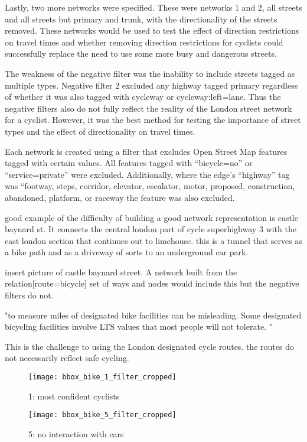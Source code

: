 Lastly, two more networks were specified. These were networks 1 and 2, all streets and all streets but primary and trunk, with the directionality of the streets removed. These networks would be used to test the effect of direction restrictions on travel times and whether removing direction restrictions for cyclists could successfully replace the need to use some more busy and dangerous streets. 

The weakness of the negative filter was the inability to include streets tagged as multiple types. Negative filter 2 excluded any highway tagged primary regardless of whether it was also tagged with cycleway or cycleway:left=lane. Thus the negative filters also do not fully reflect the reality of the London street network for a cyclist. However, it was the best method for testing the importance of street types and the effect of directionality on travel times. 


Each network is created using a filter that excludes Open Street Map features tagged with certain values. All features tagged with ``bicycle=no'' or ``service=private'' were excluded. Additionally, where the edge's ``highway'' tag was ``footway, steps, corridor, elevator, escalator, motor, proposed, construction, abandoned, platform, or raceway the feature was also excluded. 

good example of the difficulty of building a good network representation is castle baynard st. It connects the central london part of cycle superhighway 3 with the east london section that continues out to limehouse. this is a tunnel that serves as a bike path and as a driveway of sorts to an underground car park. 

insert picture of castle baynard street. A network built from the relation[route=bicycle] set of ways and nodes would include this but the negative filters do not. 


"to measure miles of designated bike facilities can be misleading. Some designated bicycling facilities involve LTS values that most people will not tolerate. "\cite{furth}

This is the challenge to using the London designated cycle routes. the routes do not necessarily reflect safe cycling.

\begin{figure}
  \centering
  \texttt{[image: bbox\_bike\_1\_filter\_cropped]}
  \caption{1: most confident cyclists}
  \label{fig:sub1}
\end{figure}

\begin{figure}
  \centering
  \texttt{[image: bbox\_bike\_5\_filter\_cropped]}
  \caption{5: no interaction with cars }
  \label{fig:sub2}
\end{figure}



